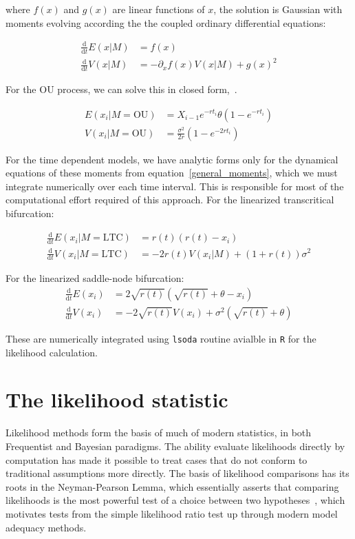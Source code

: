 \documentclass[authoryear, preprint,review,12pt]{elsarticle}
\newcommand{\ud}{\mathrm{d}}
\begin{document}
where $f(x)$ and $g(x)$ are linear functions of $x$, the solution is Gaussian with moments evolving according the the coupled ordinary differential equations:

\begin{align}
 \frac{\ud }{\ud t} E(x| M)&=  f(x) \\
\frac{\ud}{\ud t} V(x| M) &=  -\partial_x f(x) V(x|M) + g(x)^2 
  \label{general_moments}
\end{align}

For the OU process, we can solve this in closed form,~\citep{Gardiner2009}. 


\begin{align}
  E(x_i| M = \text{OU}) &= X_{i-1} e^{-r t_i} \theta \left(1 - e^{-rt_i} \right) \\
V(x_i| M = \text{OU}) &= \frac{\sigma^2}{2 r} \left(1 - e^{-2 r t_i} \right)
\label{OUsoln}
\end{align}

For the time dependent models, we have analytic forms only for the dynamical equations of these moments from equation~\eqref{general_moments}, which we must integrate numerically over each time interval.  This is responsible for most of the computational effort required of this approach.  For the linearized transcritical bifurcation:

\begin{align}
\frac{\ud }{\ud t} E(x_i| M = \text{LTC})&=  r(t)(r(t) - x_i) \\
\frac{\ud}{\ud t} V(x_i| M = \text{LTC}) &=  -2 r(t) V(x_i|M) + (1+r(t))\sigma^2 
\label{LTCsoln}
\end{align}

For the linearized saddle-node bifurcation:
\begin{align}
\frac{\ud }{\ud t} E(x_i)&=  2\sqrt{r(t)}(\sqrt{r(t)}+\theta - x_i) \\
\frac{\ud}{\ud t} V(x_i) &=  -2 \sqrt{r(t)} V(x_i) + \sigma^2 ( \sqrt{r(t)}+\theta )
\label{LSNsoln}
\end{align}

These are numerically integrated using \texttt{lsoda} routine avialble in \texttt{R} for the likelihood calculation.  

\section{The likelihood statistic}\label{Cox}
Likelihood methods form the basis of much of modern statistics, in both Frequentist and Bayesian paradigms.  
The ability evaluate likelihoods directly by computation has made it possible to treat cases that do not conform to traditional assumptions more directly.
The basis of likelihood comparisons has its roots in the Neyman-Pearson Lemma, 
which essentially asserts that comparing likelihoods is the most powerful test
of a choice between two hypotheses~\citep{Neyman1933}, which motivates
tests from the simple likelihood ratio test up through modern model adequacy methods.
\end{document}
